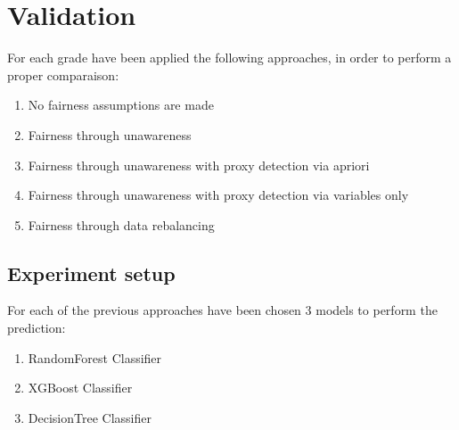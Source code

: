 \documentclass[12pt,a4paper,openright,twoside]{book}
\begin{document}
\chapter{Validation} %
\label{chap:validation}
For each grade have been applied the following approaches, in order to perform a proper comparaison:
\begin{enumerate}
    \item No fairness assumptions are made
    \item Fairness through unawareness
    \item Fairness through unawareness with proxy detection via apriori
    \item Fairness through unawareness with proxy detection via variables only
    \item Fairness through data rebalancing
\end{enumerate}

\section{Experiment setup}
For each of the previous approaches have been chosen 3 models to perform the prediction:
\begin{enumerate}
    \item RandomForest Classifier
    \item XGBoost Classifier
    \item DecisionTree Classifier
\end{enumerate}
\end{document}
